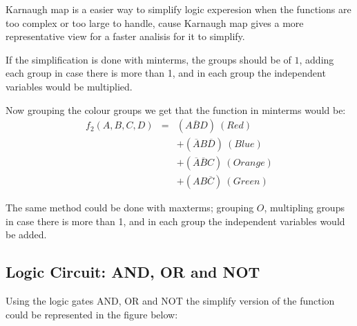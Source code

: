     Karnaugh map is a easier way to simplify logic experesion when the functions are too complex or too large to handle, cause Karnaugh map gives a more representative view for a faster analisis for it to simplify. 

    If the simplification is done with minterms, the groups should be of $1$, adding each group in case there is more than 1, and in each group the independent variables would be multiplied.
    \begin{center}
        \begin{Karnaugh}
        \end{Karnaugh}
    \end{center}
    
    Now grouping the colour groups we get that the function in minterms would be:
    \begin{eqnarray*}
        f_2(A,B,C,D)&=&(A\overline{B}D)~(Red)\\
        &&+(\overline{A}B\overline{D})~(Blue)\\
        &&+(\overline{A}\overline{B}C)~(Orange)\\
        &&+(AB\overline{C})~(Green)
    \end{eqnarray*}
 
    The same method could be done with maxterms; grouping $O$, multipling groups in case there is more than 1, and in each group the independent variables would be added.
    
    \subsection{\color{purple}Logic Circuit: AND, OR and NOT}

    Using the logic gates AND, OR and NOT the simplify version of the function could be represented in the figure below:

